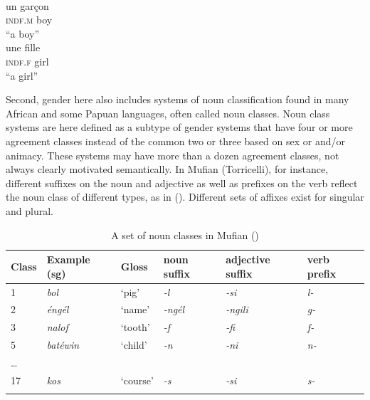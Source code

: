 \documentclass[output=collectionpaper]{langsci/langscibook}
\begin{document}
\ea
\label{ex:Sinne:3}
\\
\begin{xlist}
\ex
\gll un garçon\\
\textsc{indf.m} boy\\
\glt ``a boy''\\
\ex
\gll une fille\\
\textsc{indf.f} girl \\
\glt ``a girl''
\end{xlist}
\z

Second, gender here also includes systems of noun classification found in many African and some Papuan languages, often called noun classes. Noun class systems are here defined as a subtype of gender systems that have four or more agreement classes instead of the common two or three based on sex or and/or animacy. These systems may have more than a dozen agreement classes, not always clearly motivated semantically. In Mufian (Torricelli), for instance, different suffixes on the noun and adjective as well as prefixes on the verb reflect the noun class of different types, as in  (\citealt{Alungum1978}). Different sets of affixes exist for singular and plural.

\begin{table}[htb]
\begin{tabularx}{\textwidth}{lXXXXX}
\lsptoprule
Class & Example (sg) & Gloss & noun suffix & adjective suffix & verb prefix\\
\midrule
1 & \textit{bol} & `pig' & \textit{{}-l} & \textit{{}-si} & \textit{l-}\\
2 & \textit{éngél} & `name' & \textit{{}-ngél} & \textit{{}-ngili} & \textit{g-}\\
3 & \textit{nalof} & `tooth' & \textit{{}-f} & \textit{{}-fi} & \textit{f-}\\
5 & \textit{batéwin} & `child' & \textit{{}-n} & \textit{{}-ni} & \textit{n-}\\
… &  &  &  &  & \\
17 & \textit{kos} & `course' & \textit{{}-s} & \textit{{}-si} & \textit{s-}\\
\lspbottomrule
\end{tabularx}
\caption{
A set of noun classes in Mufian (\citealt[93]{Alungum1978})}
\label{tab:Sinne:1}
\end{table}
\end{document}
